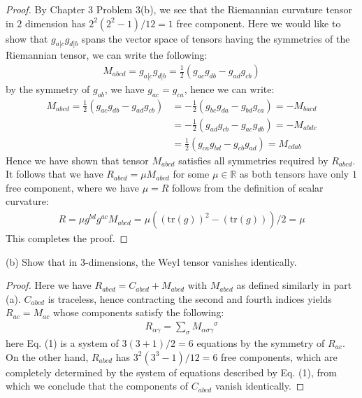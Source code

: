 \documentclass[11pt, onesided]{book}
\theoremstyle{break}
\theoremstyle{break}
\newcommand{\R}{\mathbb{R}}
\begin{document}
\begin{proof}
By Chapter 3 Problem 3(b), we see that the Riemannian curvature tensor in $2$ dimension has $2^2(2^2-1)/12 = 1$ free component. Here we would like to show that $g_{a[c}g_{d]b}$ spans the vector space of tensors having the symmetries of the Riemannian tensor, we can write the following:
\begin{align*}
M_{abcd} =  g_{a[c}g_{d]b} = \frac{1}{2}\left( g_{ac}g_{db}-g_{ad}g_{cb}\right)
\end{align*}
by the symmetry of $g_{ab}$, we have $g_{ac} = g_{ca}$, hence we can write:
\begin{align*}
M_{abcd} = \frac{1}{2}\left( g_{ac}g_{db}-g_{ad}g_{cb}\right) 
&= -\frac{1}{2}\left( g_{bc}g_{da}-g_{bd}g_{ca}\right) = -M_{bacd}\\
&= -\frac{1}{2}\left( g_{ad}g_{cb}-g_{ac}g_{db}\right) = -M_{abdc}\\
&= \frac{1}{2}\left( g_{ca}g_{bd}-g_{cb}g_{ad}\right) = M_{cdab}
\end{align*}
Hence we have shown that tensor $M_{abcd}$ satisfies all symmetries required by $R_{abcd}$. It follows that we have $R_{abcd} = \mu M_{abcd}$ for some $\mu \in \R$ as both tensors have only $1$ free component, where we have $\mu = R$ follows from the definition of scalar curvature:
\begin{align*}
R =\mu g^{bd}g^{ac}M_{abcd} = \mu \left( (\text{tr}(g))^2 - (\text{tr}(g))\right)/2 = \mu
\end{align*}
This completes the proof. 
\end{proof}

(b) Show that in $3$-dimensions, the Weyl tensor vanishes identically. 
\begin{proof}
Here we have $R_{abcd} = C_{abcd}+M_{abcd}$ with $M_{abcd}$ as defined similarly in part (a). $C_{abcd}$ is traceless, hence contracting the second and fourth indices yields $R_{ac} = M_{ac}$ whose components satisfy the following: 
\begin{align}
R_{\alpha\gamma} =\sum_{\sigma} M_{\alpha\sigma\gamma}{}^\sigma 
\end{align}
here Eq. (1) is a system of $3(3+1)/2 = 6$ equations by the symmetry of $R_{ac}$. On the other hand, $R_{abcd}$ has $3^2(3^3-1)/12 = 6$ free components, which are completely determined by the system of equations described by Eq. (1), from which we conclude that the components of $C_{abcd}$ vanish identically. 
\end{proof}

\newpage
\end{document}

